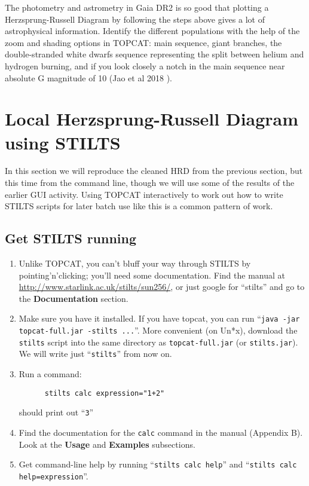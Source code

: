 \documentclass{article}
\newcommand{\winfig}[2]  %
           {\vspace*{-0.5cm}
            \hspace*{0.5cm}\mbox{\vtop{\hbox{\includegraphics[#1]
                                                             {figures/#2}}}}}
\newcommand{\lab}[1]{{\bf #1}}
\newcommand{\turl}[1]{{\color{blue}\url{#1}}}
\begin{document}
\begin{minipage}[t]{11cm}
  \raggedright
  The photometry and astrometry in Gaia DR2 is so good that plotting
  a Herzsprung-Russell Diagram by following the steps above gives
  a lot of astrophysical information.
  Identify the different populations with the help of the zoom and
  shading options in TOPCAT: main sequence, giant branches,
  the double-stranded white dwarfs sequence representing the
  split between helium and hydrogen burning, and if you look
  closely a notch in the main sequence near absolute G magnitude of 10
  (Jao et al 2018 \cite{2018ApJ...861L..11J}).
\end{minipage}
\begin{minipage}[t]{8cm}
  \vspace*{-1.5cm}
  \winfig{width=8cm}{hrd_only.png}
\end{minipage}

\newpage

\section{Local Herzsprung-Russell Diagram using STILTS}

In this section we will reproduce the cleaned HRD from the previous section,
but this time from the command line, though we will use some of the results
of the earlier GUI activity.
Using TOPCAT interactively to work out how to write STILTS scripts
for later batch use like this is a common pattern of work.

\subsection{Get STILTS running}

\begin{enumerate}
\item Unlike TOPCAT, you can't bluff your way through STILTS
      by pointing'n'clicking; you'll need some documentation.
      Find the manual at \turl{http://www.starlink.ac.uk/stilts/sun256/},
      or just google for ``stilts'' and go to the \lab{Documentation} section.
\item Make sure you have it installed.  If you have topcat, you can
      run ``{\tt java -jar topcat-full.jar -stilts ...}''.
      More convenient (on Un*x), download the {\tt stilts} script
      into the same directory as {\tt topcat-full.jar} (or {\tt stilts.jar}).
      We will write just ``{\tt stilts}'' from now on.
\item Run a command:
      \vspace*{-2ex}
      \begin{verbatim}
      stilts calc expression="1+2"
      \end{verbatim}
      \vspace*{-4ex}
      should print out ``{\tt 3}''
\item Find the documentation for the {\tt calc} command in the manual
      (Appendix B).
      Look at the \lab{Usage} and \lab{Examples} subsections.
\item Get command-line help by running ``{\tt stilts calc help}'' and
      ``{\tt stilts calc help=expression}''.
\end{enumerate}
\end{document}
